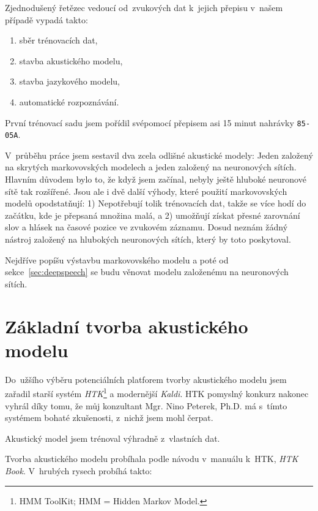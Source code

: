 Zjednodušený řetězec vedoucí od~zvukových dat k~jejich přepisu v~našem případě
vypadá takto:\begin{enumerate}
\item{sběr trénovacích dat,}
\item{stavba akustického modelu,}
\item{stavba jazykového modelu,}
\item{automatické rozpoznávání.}
\end{enumerate}

První trénovací sadu jsem pořídil svépomocí přepisem asi 15 minut nahrávky
\texttt{85-05A}.

V~průběhu práce jsem sestavil dva zcela odlišné akustické modely: Jeden založený
na skrytých markovovských modelech a jeden založený na neuronových sítích.
Hlavním důvodem bylo to, že když jsem začínal, nebyly ještě hluboké neuronové
sítě tak rozšířené. Jsou ale i dvě další výhody, které použití markovovských
modelů opodstatňují: 1) Nepotřebují tolik trénovacích dat, takže se více hodí do
začátku, kde je přepsaná množina malá, a 2) umožňují získat přesné zarovnání
slov a hlásek na časové pozice ve zvukovém záznamu. Dosud neznám žádný nástroj
založený na hlubokých neuronových sítích, který by toto poskytoval.

Nejdříve popíšu výstavbu markovovského modelu a poté od
sekce~\ref{sec:deepspeech} se budu věnovat modelu založenému na neuronových
sítích.

\section{Základní tvorba akustického modelu}

Do~užšího výběru potenciálních platforem tvorby akustického modelu jsem zařadil
starší systém \textit{HTK}\footnote{HMM ToolKit; HMM = Hidden Markov Model.}\cite{young2002htk} a
modernější \textit{Kaldi}\cite{povey2011kaldi}. HTK pomyslný konkurz nakonec
vyhrál díky tomu, že můj konzultant Mgr. Nino Peterek, Ph.D. má s~tímto systémem
bohaté zkušenosti, z~nichž jsem mohl čerpat.

Akustický model jsem trénoval výhradně z~vlastních dat.

Tvorba akustického modelu probíhala podle návodu v~manuálu k~HTK, \textit{HTK
Book}. V~hrubých rysech probíhá takto:

